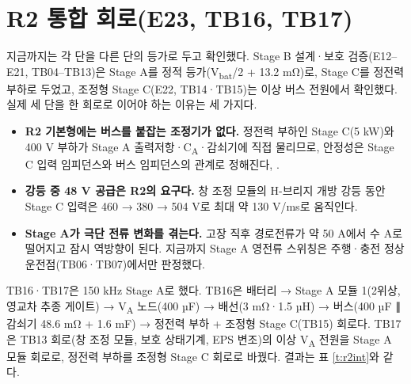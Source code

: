 \section{R2 통합 회로(E23, TB16, TB17)}

지금까지는 각 단을 다른 단의 등가로 두고 확인했다. Stage B 설계·보호 검증(E12–E21, TB04–TB13)은 Stage A를 정적 등가(V\textsubscript{bat}/2 + 13.2 mΩ)로, Stage C를 정전력 부하로 두었고, 조정형 Stage C(E22, TB14·TB15)는 이상 버스 전원에서 확인했다. 실제 세 단을 한 회로로 이어야 하는 이유는 세 가지다.

\begin{itemize}
\item \textbf{R2 기본형에는 버스를 붙잡는 조정기가 없다.} 정전력 부하인 Stage C(5 kW)와 400 V 부하가 Stage A 출력저항·C\textsubscript{A}·감쇠기에 직접 물리므로, 안정성은 Stage C 입력 임피던스와 버스 임피던스의 관계로 정해진다\cite{b20}, \cite{b21}.
\item \textbf{강등 중 48 V 공급은 R2의 요구다.} 창 조정 모듈의 H-브리지 개방 강등 동안 Stage C 입력은 460 → 380 → 504 V로 최대 약 130 V/ms로 움직인다.
\item \textbf{Stage A가 극단 전류 변화를 겪는다.} 고장 직후 경로전류가 약 50 A에서 수 A로 떨어지고 잠시 역방향이 된다. 지금까지 Stage A 영전류 스위칭은 주행·충전 정상 운전점(TB06·TB07)에서만 판정했다.
\end{itemize}

TB16·TB17은 150 kHz Stage A로 했다. TB16은 배터리 → Stage A 모듈 1(2위상, 영교차 추종 게이트) → V\textsubscript{A} 노드(400 µF) → 배선(3 mΩ·1.5 µH) → 버스(400 µF ∥ 감쇠기 48.6 mΩ + 1.6 mF) → 정전력 부하 + 조정형 Stage C(TB15) 회로다. TB17은 TB13 회로(창 조정 모듈, 보호 상태기계, EPS 변조)의 이상 V\textsubscript{A} 전원을 Stage A 모듈 회로로, 정전력 부하를 조정형 Stage C 회로로 바꿨다. 결과는 표 \ref{t:r2int}와 같다.

